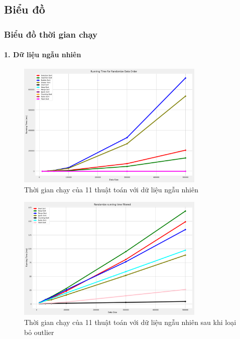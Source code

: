 \subsection{Biểu đồ}
\subsubsection{Biểu đồ thời gian chạy}

\paragraph{1. Dữ liệu ngẫu nhiên}
\begin{figure}[H]
    \centering
    \includegraphics[width=0.8\textwidth]{exprimental_result/images/randomize_running_time.png}
    \caption{Thời gian chạy của 11 thuật toán với dữ liệu ngẫu nhiên}
\end{figure}



\begin{figure}[H]
    \centering
    \includegraphics[width=0.8\textwidth]{exprimental_result/images/randomize_running_time_filtered.png}
    \caption{Thời gian chạy của 11 thuật toán với dữ liệu ngẫu nhiên sau khi loại bỏ outlier}
\end{figure}




